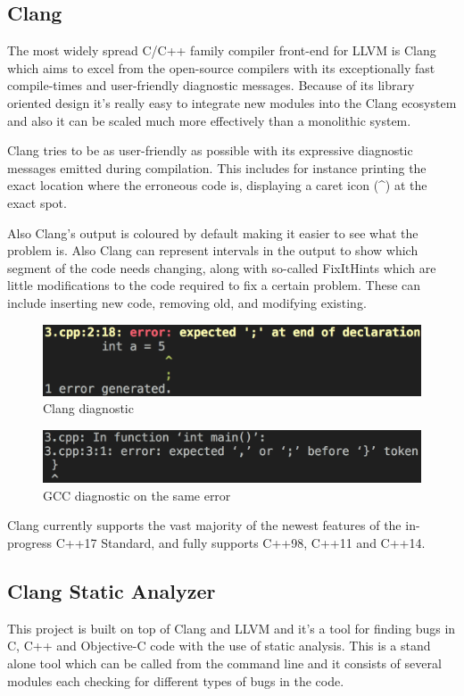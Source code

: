 \subsection{Clang}
\par The most widely spread C/C++ family compiler front-end for LLVM is Clang which aims to excel from the open-source compilers with its exceptionally fast compile-times and user-friendly diagnostic messages\cite{clang_features}. Because of its library oriented design it's really easy to integrate new modules into the Clang ecosystem and also it can be scaled much more effectively than a monolithic system. \medskip
\par Clang tries to be as user-friendly as possible with its expressive diagnostic messages emitted during compilation. This includes for instance printing the exact location where the erroneous code is, displaying a caret icon (\textasciicircum) at the exact spot. \medskip 
\par Also Clang's output is coloured by default making it easier to see what the problem is. Also Clang can represent intervals in the output to show which segment of the code needs changing, along with so-called FixItHints which are little modifications to the code required to fix a certain problem. These can include inserting new code, removing old, and modifying existing.
\begin{figure}[h]
	\caption{Clang diagnostic}
	\includegraphics[scale = 0.42]{images/clang_diag}
\end{figure}
\begin{figure}[h]
	\caption{GCC diagnostic on the same error}
	\includegraphics[scale = 0.352]{images/gcc_diag}
\end{figure}
\par Clang currently supports the vast majority of the newest features of the in-progress C++17 Standard, and fully supports C++98, C++11 and C++14\cite{clang_language_support}. 
\subsection{Clang Static Analyzer}
\par This project is built on top of Clang and LLVM and it's a tool for finding bugs in C, C++ and Objective-C code with the use of static analysis. This is a stand alone tool which can be called from the command line and it consists of several modules each checking for different types of bugs in the code.
